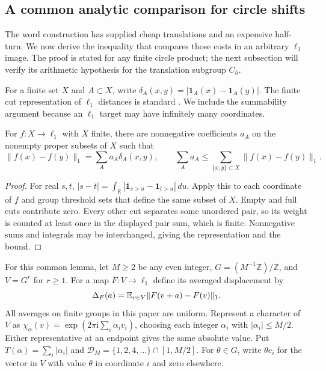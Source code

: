 \subsection{A common analytic comparison for circle shifts}

The word construction has supplied cheap translations and an expensive
half-turn. We now derive the inequality that compares those costs in an
arbitrary $\ell_1$ image. The proof is stated for any finite circle product;
the next subsection will verify its arithmetic hypothesis for the translation
subgroup $C_h$.

For a finite set $X$ and $A\subset X$, write
$\delta_A(x,y)=|\mathbf1_A(x)-\mathbf1_A(y)|$. The finite cut
representation of $\ell_1$ distances is standard
\cite[Section~4]{LinialLondonRabinovich1995}. We include the summability
argument because an $\ell_1$ target may have infinitely many coordinates.

\begin{lemma}\label{pre:cuts}
For $f:X\to\ell_1$ with $X$ finite, there are nonnegative coefficients
$a_A$ on the nonempty proper subsets of $X$ such that
\[
 \|f(x)-f(y)\|_1=\sum_A a_A\delta_A(x,y),\qquad
 \sum_Aa_A\leq\sum_{\{x,y\}\subset X}\|f(x)-f(y)\|_1.
\]
\end{lemma}
\begin{proof}
For real $s,t$,
$|s-t|=\int_{\mathbb R}|\mathbf1_{s>u}-\mathbf1_{t>u}|\,du$.
Apply this to each coordinate of $f$ and group threshold sets that define
the same subset of $X$. Empty and full cuts contribute zero. Every other
cut separates some unordered pair, so its weight is counted at least once
in the displayed pair sum, which is finite. Nonnegative sums and integrals
may be interchanged, giving the representation and the bound.
\end{proof}

For this common lemma, let $M\geq2$ be any even integer,
$G=(M^{-1}\mathbb Z)/\mathbb Z$, and $V=G^r$ for
$r\geq1$. For a map $F:V\to\ell_1$ define its averaged displacement by
\[
 \Delta_F(a)=\mathbb E_{v\in V}\|F(v+a)-F(v)\|_1.
\]
All averages on finite groups in this paper are uniform. Represent a
character of $V$ as
$\chi_\alpha(v)=\exp(2\pi\mathrm i\sum_i\alpha_i v_i)$, choosing each
integer $\alpha_i$ with $|\alpha_i|\leq M/2$. Either representative at an
endpoint gives the same absolute value. Put
$T(\alpha)=\sum_i|\alpha_i|$ and
$\mathcal D_M=\{1,2,4,\ldots\}\cap[1,M/2]$.
For $\theta\in G$, write $\theta e_i$ for the vector in $V$ with value
$\theta$ in coordinate $i$ and zero elsewhere.

